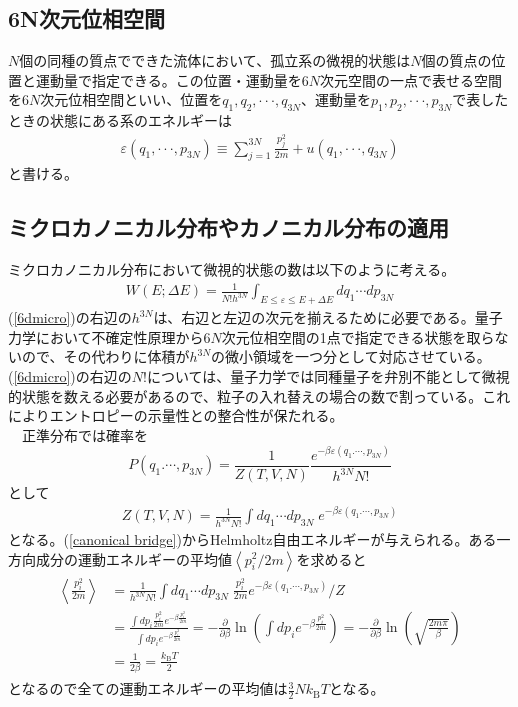 \documentclass[a4paper,12pt, oneside, openany]{jsbook}
\begin{document}
\subsection{6N次元位相空間}
$N$個の同種の質点でできた流体において、孤立系の微視的状態は$N$個の質点の位置と運動量で指定できる。この位置・運動量を$6N$次元空間の一点で表せる空間を$6
N$次元位相空間といい、位置を$q_1,q_2,\cdot \cdot \cdot ,q_{3N}$、運動量を$p_1,p_2,\cdot \cdot \cdot ,p_{3N}$で表したときの状態にある系のエネルギーは
\begin{eqnarray}
  \varepsilon(q_1,\cdot \cdot \cdot ,p_{3N})\equiv  \sum_{j = 1}^{3N} \frac{p_j^2}{2m}+u(q_1,\cdot \cdot \cdot ,q_{3N}) 
\end{eqnarray}
と書ける。
\subsection{ミクロカノニカル分布やカノニカル分布の適用}
ミクロカノニカル分布において微視的状態の数は以下のように考える。
\begin{eqnarray}
  \label{6dmicro}
  W(E;\Delta E) = \frac{1}{N ! h^{3N}} \int_{E\leq \varepsilon \leq E+\Delta E} dq_1\cdots dp_{3N}
\end{eqnarray}
(\ref{6dmicro})の右辺の$h^{3N}$は、右辺と左辺の次元を揃えるために必要である。量子力学において不確定性原理から$6N$次元位相空間の1点で指定できる状態を取らないので、その代わりに体積が$h^{3N}$の微小領域を一つ分として対応させている。(\ref{6dmicro})の右辺の$N!$については、量子力学では同種量子を弁別不能として微視的状態を数える必要があるので、粒子の入れ替えの場合の数で割っている。これによりエントロピーの示量性との整合性が保たれる。\\
　正準分布では確率を
\begin{equation}
  P(q_1.\cdots ,p_{3N}) =\frac{1}{Z(T,V,N)}\frac{e^{-\beta \varepsilon(q_1.\cdots ,p_{3N})}}{h^{3N}N!}
\end{equation}
として
\begin{eqnarray}
  Z(T,V,N) = \frac{1}{h^{3N}N!}\int dq_1 \cdots dp_{3N} \;e^{-\beta \varepsilon(q_1.\cdots ,p_{3N})}
\end{eqnarray}
となる。(\ref{canonical bridge})からHelmholtz自由エネルギーが与えられる。ある一方向成分の運動エネルギーの平均値$\left\langle p_i^2/2m\right\rangle$を求めると
\begin{eqnarray}
  \begin{split}
    \left\langle \frac{p_i^2}{2m}\right\rangle &= \frac{1}{h^{3N}N!}\int dq_1 \cdots dp_{3N} \;\frac{p_i^2}{2m}e^{-\beta \varepsilon(q_1.\cdots ,p_{3N})}/Z\\
    &=\frac{\int dp_i  \frac{p_i^2}{2m} e^{-\beta \frac{p_i^2}{2m}}}{\int dp_i e^{-\beta \frac{p_i^2}{2m}}}=-\frac{\partial}{\partial \beta} \ln \left(\int dp_i e^{-\beta \frac{p_i^2}{2m}} \right) =-\frac{\partial}{\partial \beta}\ln \left(\sqrt{\frac{2m\pi}{\beta}}\right)\\
    &=\frac{1}{2\beta}=\frac{k_\text{B}T}{2}
  \end{split}
\end{eqnarray}
となるので全ての運動エネルギーの平均値は$\frac{3}{2}Nk_\text{B}T$となる。
\end{document}
